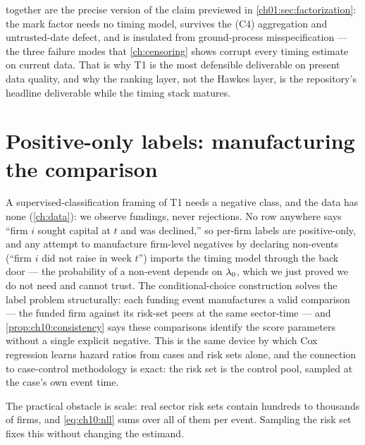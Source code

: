  together are the precise
version of the claim previewed in \cref{ch01:sec:factorization}: the mark
factor needs no timing model, survives the (C4) aggregation and
untrusted-date defect, and is insulated from ground-process
misspecification --- the three failure modes that \cref{ch:censoring}
shows corrupt every timing estimate on current data. That is why T1 is
the most defensible deliverable on present data quality, and why the
ranking layer, not the Hawkes layer, is the repository's headline
deliverable while the timing stack matures.

\section{Positive-only labels: manufacturing the comparison}\label{ch10:sec:positive}

A supervised-classification framing of T1 needs a negative class, and the
data has none (\cref{ch:data}): we observe fundings, never rejections. No
row anywhere says ``firm $i$ sought capital at $t$ and was declined,'' so
per-firm labels are positive-only, and any attempt to manufacture
firm-level negatives by declaring non-events (``firm $i$ did not raise in
week $t$'') imports the timing model through the back door --- the
probability of a non-event depends on $\lambda_0$, which we just proved we
do not need and cannot trust. The conditional-choice construction solves
the label problem structurally: each funding event manufactures a valid
comparison --- the funded firm against its risk-set peers at the same
sector-time --- and \cref{prop:ch10:consistency} says these comparisons
identify the score parameters without a single explicit negative. This is
the same device by which Cox regression learns hazard ratios from cases
and risk sets alone, and the connection to case-control methodology is
exact: the risk set is the control pool, sampled at the case's own event
time.

The practical obstacle is scale: real sector risk sets contain hundreds
to thousands of firms, and \cref{eq:ch10:nll} sums over all of them per
event. Sampling the risk set fixes this without changing the estimand.

